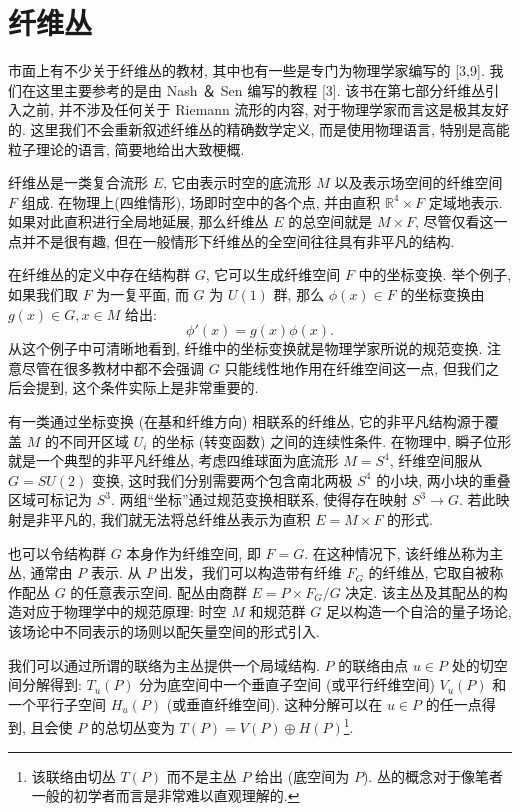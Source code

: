 \documentclass{article}
\begin{document}
\section{纤维丛}
市面上有不少关于纤维丛的教材, 其中也有一些是专门为物理学家编写的 [3,9]. 我们在这里主要参考的是由 Nash ＆ Sen 编写的教程 [3]. 该书在第七部分纤维丛引入之前, 并不涉及任何关于 Riemann 流形的内容, 对于物理学家而言这是极其友好的. 这里我们不会重新叙述纤维丛的精确数学定义, 而是使用物理语言, 特别是高能粒子理论的语言, 简要地给出大致梗概.

纤维丛是一类复合流形 $E$, 它由表示时空的底流形 $M$ 以及表示场空间的纤维空间 $F$ 组成. 在物理上(四维情形), 场即时空中的各个点, 并由直积 $\mathbb{R}^{4}\times F$ 定域地表示. 如果对此直积进行全局地延展, 那么纤维丛 $E$ 的总空间就是 $ M\times F$, 尽管仅看这一点并不是很有趣, 但在一般情形下纤维丛的全空间往往具有非平凡的结构.

在纤维丛的定义中存在结构群 $G$, 它可以生成纤维空间 $F$ 中的坐标变换. 举个例子, 如果我们取 $F$ 为一复平面, 而 $G$ 为 $U(1)$ 群, 那么 $\phi(x) \in F$ 的坐标变换由 $g(x) \in G, x \in M$ 给出:
\begin{equation}
\phi'(x)=g(x)\phi(x).
\end{equation}
从这个例子中可清晰地看到, 纤维中的坐标变换就是物理学家所说的规范变换. 注意尽管在很多教材中都不会强调 $G$ 只能线性地作用在纤维空间这一点, 但我们之后会提到, 这个条件实际上是非常重要的.

有一类通过坐标变换 (在基和纤维方向) 相联系的纤维丛, 它的非平凡结构源于覆盖 $M$ 的不同开区域 $U_{i}$ 的坐标 (转变函数) 之间的连续性条件. 在物理中, 瞬子位形就是一个典型的非平凡纤维丛, 考虑四维球面为底流形 $M = S^{4}$, 纤维空间服从 $G = SU(2)$ 变换, 这时我们分别需要两个包含南北两极 $S^{4}$ 的小块, 两小块的重叠区域可标记为 $S^{3}$. 两组``坐标''通过规范变换相联系, 使得存在映射 $S^{3}\rightarrow G$. 若此映射是非平凡的, 我们就无法将总纤维丛表示为直积 $E = M\times F$ 的形式.

\par 也可以令结构群 $G$ 本身作为纤维空间, 即 $F = G$. 在这种情况下, 该纤维丛称为主丛, 通常由 $P$ 表示. 从 $P$ 出发，我们可以构造带有纤维 $F_{G}$ 的纤维丛, 它取自被称作配丛 $G$ 的任意表示空间. 配丛由商群 $E = P\times F_{G}/G$ 决定. 该主丛及其配丛的构造对应于物理学中的规范原理: 时空 $M$ 和规范群 $G$ 足以构造一个自洽的量子场论, 该场论中不同表示的场则以配矢量空间的形式引入.

\par 我们可以通过所谓的联络为主丛提供一个局域结构. $P$ 的联络由点 $u \in P$ 处的切空间分解得到: $T_{u}(P)$ 分为底空间中一个垂直子空间 (或平行纤维空间) $V_{u}(P)$ 和一个平行子空间 $H_{u}(P)$ (或垂直纤维空间). 这种分解可以在 $u\in P$ 的任一点得到, 且会使 $P$ 的总切丛变为 $T(P)= V(P)\oplus H(P)$\footnote{该联络由切丛 $T(P)$ 而不是主丛 $P$ 给出 (底空间为 $P$). 丛的概念对于像笔者一般的初学者而言是非常难以直观理解的.}.
\end{document}
